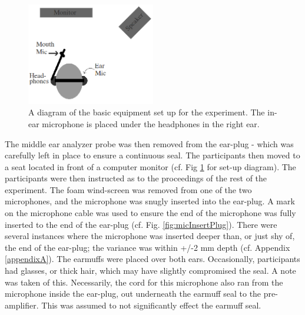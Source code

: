 \begin{figure}
\includegraphics[width=0.5\textwidth]{figure/overallSetUp.png}
\caption{A diagram of the basic equipment set up for the experiment.  The in-ear microphone is placed under the headphones in the right ear.}
\label{fig:overallSetUp}
\end{figure}
The middle ear analyzer probe was then removed from the ear-plug - which was carefully left in place to ensure a continuous seal.  The participants then moved to a seat located in front of a computer monitor (cf. Fig \ref{fig:overallSetUp} for set-up diagram).  The participants were then instructed as to the proceedings of the rest of the experiment. The foam wind-screen was removed from one of the two microphones, and the microphone was snugly inserted into the ear-plug.  A mark on the microphone cable was used to ensure the end of the microphone was fully inserted to the end of the ear-plug (cf. Fig. \ref{fig:micInsertPlug}).  
There were several instances where the microphone was inserted deeper than, or just shy of, the end of the ear-plug; the variance was within +/-2 mm depth (cf. Appendix \ref{appendixA}).  The earmuffs were placed over both ears.  Occasionally, participants had glasses, or thick hair, which may have slightly compromised the seal.  A note was taken of this. Necessarily, the cord for this microphone also ran from the microphone inside the ear-plug, out underneath the earmuff seal to the pre-amplifier.  This was assumed to not significantly effect the earmuff seal.




